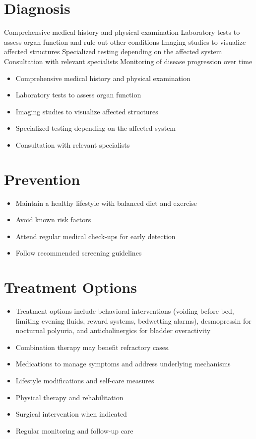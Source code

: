 \section{Diagnosis}
Comprehensive medical history and physical examination Laboratory tests to assess organ function and rule out other conditions Imaging studies to visualize affected structures Specialized testing depending on the affected system Consultation with relevant specialists Monitoring of disease progression over time

\begin{itemize}[noitemsep]
  \item Comprehensive medical history and physical examination
  \item Laboratory tests to assess organ function
  \item Imaging studies to visualize affected structures
  \item Specialized testing depending on the affected system
  \item Consultation with relevant specialists
\end{itemize}
\section{Prevention}
\begin{itemize}[noitemsep]
  \item Maintain a healthy lifestyle with balanced diet and exercise
  \item Avoid known risk factors
  \item Attend regular medical check-ups for early detection
  \item Follow recommended screening guidelines
\end{itemize}
\section{Treatment Options}
\begin{itemize}[noitemsep]
  \item Treatment options include behavioral interventions (voiding before bed, limiting evening fluids, reward systems, bedwetting alarms), desmopressin for nocturnal polyuria, and anticholinergics for bladder overactivity
  \item Combination therapy may benefit refractory cases.
  \item Medications to manage symptoms and address underlying mechanisms
  \item Lifestyle modifications and self-care measures
  \item Physical therapy and rehabilitation
  \item Surgical intervention when indicated
  \item Regular monitoring and follow-up care
\end{itemize}
